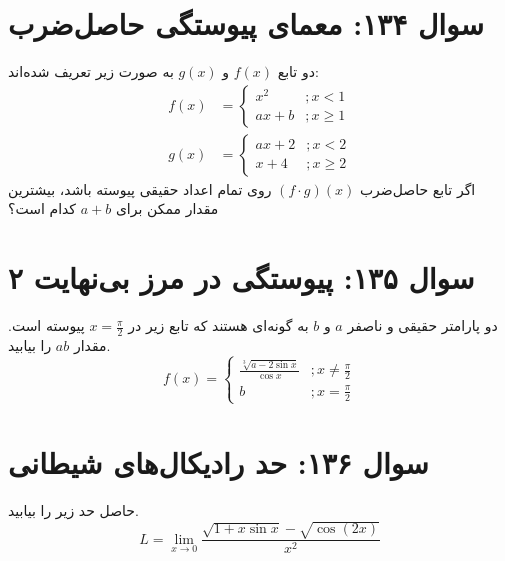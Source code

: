 \documentclass[12pt]{article}
\begin{document}
\section*{سوال ۱۳۴: معمای پیوستگی حاصل‌ضرب}
دو تابع \(f(x)\) و \(g(x)\) به صورت زیر تعریف شده‌اند:
\begin{align*}
	f(x) &= \begin{cases} x^2 &; x < 1 \\ ax+b &; x \ge 1 \end{cases} \\
	g(x) &= \begin{cases} ax+2 &; x < 2 \\ x+4 &; x \ge 2 \end{cases}
\end{align*}
اگر تابع حاصل‌ضرب \( (f \cdot g)(x) \) روی تمام اعداد حقیقی پیوسته باشد، بیشترین مقدار ممکن برای \(a+b\) کدام است؟

\vspace{1cm}
\hrulefill
\vspace{1cm}

\section*{سوال ۱۳۵: پیوستگی در مرز بی‌نهایت ۲}
دو پارامتر حقیقی و ناصفر \(a\) و \(b\) به گونه‌ای هستند که تابع زیر در \(x=\frac{\pi}{2}\) پیوسته است. مقدار \(ab\) را بیابید.
\begin{displaymath}
	f(x)=
	\begin{cases}
		\frac{\sqrt[3]{a - 2\sin x}}{\cos x} & ; x \ne \frac{\pi}{2} \\
		b & ; x = \frac{\pi}{2}
	\end{cases}
\end{displaymath}

\vspace{1cm}
\hrulefill
\vspace{1cm}

\section*{سوال ۱۳۶: حد رادیکال‌های شیطانی}
حاصل حد زیر را بیابید.
\begin{displaymath}
	L = \lim_{x \to 0} \frac{\sqrt{1+x\sin x} - \sqrt{\cos(2x)}}{x^2}
\end{displaymath}
\end{document}
